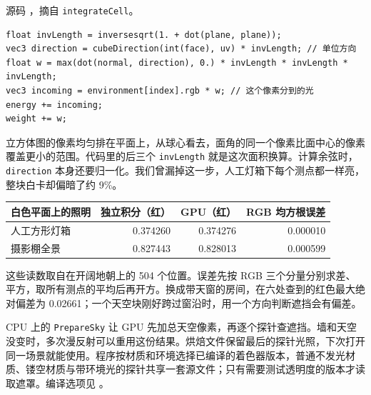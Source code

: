 {\small\color{quiet}源码 ，摘自 \texttt{integrateCell}。}
\begin{lstlisting}
float invLength = inversesqrt(1. + dot(plane, plane));
vec3 direction = cubeDirection(int(face), uv) * invLength; // 单位方向
float w = max(dot(normal, direction), 0.) * invLength * invLength * invLength;
vec3 incoming = environment[index].rgb * w; // 这个像素分到的光
energy += incoming;
weight += w;
\end{lstlisting}
立方体图的像素均匀排在平面上，从球心看去，面角的同一个像素比面中心的像素覆盖更小的范围。代码里的后三个 \texttt{invLength} 就是这次面积换算。计算余弦时，\texttt{direction} 本身还要归一化。我们曾漏掉这一步，人工灯箱下每个测点都一样亮，整块白卡却偏暗了约 9\%。

\begin{center}\small
\begin{tabular}{@{}lrrr@{}}\toprule
白色平面上的照明 & 独立积分（红） & GPU（红） & RGB 均方根误差\\\midrule
人工方形灯箱 & 0.374260 & 0.374276 & 0.000010\\
摄影棚全景 & 0.827443 & 0.828013 & 0.000599\\\bottomrule
\end{tabular}
\end{center}
这些读数取自在开阔地朝上的 504 个位置。误差先按 RGB 三个分量分别求差、平方，取所有测点的平均后再开方。换成带天窗的房间，在六处查到的红色最大绝对偏差为 0.02661；一个天空块刚好跨过窗沿时，用一个方向判断遮挡会有偏差。

CPU 上的 \texttt{PrepareSky} 让 GPU 先加总天空像素，再逐个探针查遮挡。墙和天空没变时，多次漫反射可以重用这份结果。烘焙文件保留最后的探针光照，下次打开同一场景就能使用。程序按材质和环境选择已编译的着色器版本，普通不发光材质、镂空材质与带环境光的探针共享一套源文件；只有需要测试透明度的版本才读取遮罩。编译选项见 。
